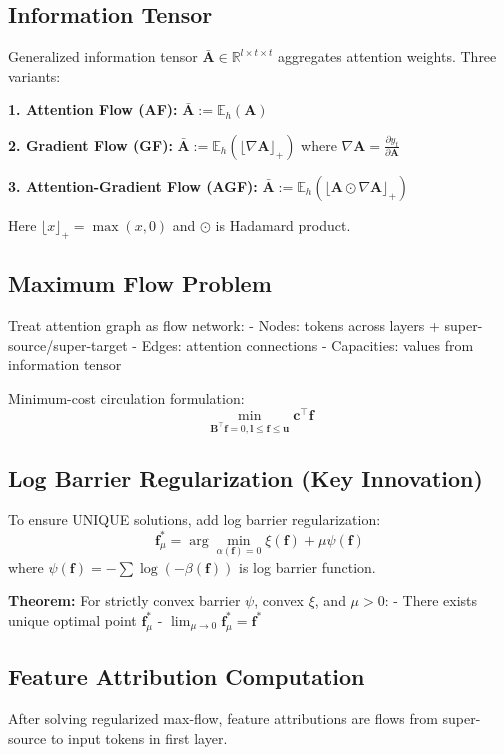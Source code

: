 \subsection{Information Tensor}
Generalized information tensor $\bar{\mathbf{A}} \in \mathbb{R}^{l \times t \times t}$ aggregates attention weights. Three variants:

\textbf{1. Attention Flow (AF):}
$\bar{\mathbf{A}} := \mathbb{E}_h(\mathbf{A})$

\textbf{2. Gradient Flow (GF):}
$\bar{\mathbf{A}} := \mathbb{E}_h(\lfloor \nabla \mathbf{A} \rfloor_+)$
where $\nabla \mathbf{A} = \frac{\partial y_t}{\partial \mathbf{A}}$

\textbf{3. Attention-Gradient Flow (AGF):}
$\bar{\mathbf{A}} := \mathbb{E}_h(\lfloor \mathbf{A} \odot \nabla \mathbf{A} \rfloor_+)$

Here $\lfloor x \rfloor_+ = \max(x, 0)$ and $\odot$ is Hadamard product.

\subsection{Maximum Flow Problem}
Treat attention graph as flow network:
- Nodes: tokens across layers + super-source/super-target
- Edges: attention connections
- Capacities: values from information tensor

Minimum-cost circulation formulation:
\begin{equation}
\min_{\mathbf{B}^\top \mathbf{f} = 0, \mathbf{l} \leq \mathbf{f} \leq \mathbf{u}} \mathbf{c}^\top \mathbf{f}
\end{equation}

\subsection{Log Barrier Regularization (Key Innovation)}
To ensure UNIQUE solutions, add log barrier regularization:
\begin{equation}
\mathbf{f}^*_\mu = \arg\min_{\alpha(\mathbf{f})=0} \xi(\mathbf{f}) + \mu \psi(\mathbf{f})
\end{equation}
where $\psi(\mathbf{f}) = -\sum \log(-\beta(\mathbf{f}))$ is log barrier function.

\textbf{Theorem:} For strictly convex barrier $\psi$, convex $\xi$, and $\mu > 0$:
- There exists unique optimal point $\mathbf{f}^*_\mu$
- $\lim_{\mu \to 0} \mathbf{f}^*_\mu = \mathbf{f}^*$

\subsection{Feature Attribution Computation}
After solving regularized max-flow, feature attributions are flows from super-source to input tokens in first layer.

